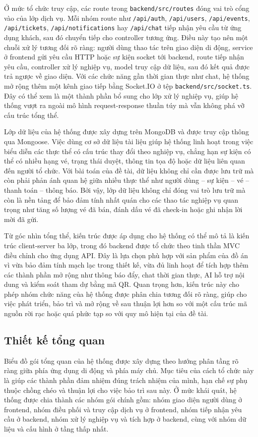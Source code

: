 \documentclass[../DoAn.tex]{subfiles}
\begin{document}
Ở mức tổ chức truy cập, các route trong \texttt{backend/src/routes} đóng vai trò cổng vào của lớp dịch vụ. Mỗi nhóm route như \texttt{/api/auth}, \texttt{/api/users}, \texttt{/api/events}, \texttt{/api/tickets}, \texttt{/api/notifications} hay \texttt{/api/chat} tiếp nhận yêu cầu từ ứng dụng khách, sau đó chuyển tiếp cho controller tương ứng. Điều này tạo nên một chuỗi xử lý tương đối rõ ràng: người dùng thao tác trên giao diện di động, service ở frontend gửi yêu cầu \gls{HTTP} hoặc sự kiện socket tới backend, route tiếp nhận yêu cầu, controller xử lý nghiệp vụ, model truy cập dữ liệu, sau đó kết quả được trả ngược về giao diện. Với các chức năng gần thời gian thực như chat, hệ thống mở rộng thêm một kênh giao tiếp bằng Socket.IO ở tệp \texttt{backend/src/socket.ts}. Đây có thể xem là một thành phần bổ sung cho lớp xử lý nghiệp vụ, giúp hệ thống vượt ra ngoài mô hình request-response thuần túy mà vẫn không phá vỡ cấu trúc tổng thể.

Lớp dữ liệu của hệ thống được xây dựng trên MongoDB và được truy cập thông qua Mongoose. Việc dùng cơ sở dữ liệu tài liệu giúp hệ thống linh hoạt trong việc biểu diễn các thực thể có cấu trúc thay đổi theo nghiệp vụ, chẳng hạn sự kiện có thể có nhiều hạng vé, trạng thái duyệt, thông tin tọa độ hoặc dữ liệu liên quan đến người tổ chức. Với bài toán của đề tài, dữ liệu không chỉ cần được lưu trữ mà còn phải phản ánh quan hệ giữa nhiều thực thể như người dùng -- sự kiện -- vé -- thanh toán -- thông báo. Bởi vậy, lớp dữ liệu không chỉ đóng vai trò lưu trữ mà còn là nền tảng để bảo đảm tính nhất quán cho các thao tác nghiệp vụ quan trọng như tăng số lượng vé đã bán, đánh dấu vé đã check-in hoặc ghi nhận lời mời đã gửi.

Từ góc nhìn tổng thể, kiến trúc được áp dụng cho hệ thống có thể mô tả là kiến trúc client-server ba lớp, trong đó backend được tổ chức theo tinh thần MVC điều chỉnh cho ứng dụng \gls{API}. Đây là lựa chọn phù hợp với sản phẩm của đồ án vì vừa bảo đảm tính mạch lạc trong thiết kế, vừa đủ linh hoạt để tích hợp thêm các thành phần mở rộng như thông báo đẩy, chat thời gian thực, AI hỗ trợ nội dung và kiểm soát tham dự bằng mã \gls{QR}. Quan trọng hơn, kiến trúc này cho phép nhóm chức năng của hệ thống được phân chia tương đối rõ ràng, giúp cho việc phát triển, bảo trì và mở rộng về sau thuận lợi hơn so với một cấu trúc mã nguồn rời rạc hoặc quá phức tạp so với quy mô hiện tại của đề tài.

\subsection{Thiết kế tổng quan}
Biểu đồ gói tổng quan của hệ thống được xây dựng theo hướng phân tầng rõ ràng giữa phía ứng dụng di động và phía máy chủ. Mục tiêu của cách tổ chức này là giúp các thành phần đảm nhiệm đúng trách nhiệm của mình, hạn chế sự phụ thuộc chồng chéo và thuận lợi cho việc bảo trì sau này. Ở mức khái quát, hệ thống được chia thành các nhóm gói chính gồm: nhóm giao diện người dùng ở frontend, nhóm điều phối và truy cập dịch vụ ở frontend, nhóm tiếp nhận yêu cầu ở backend, nhóm xử lý nghiệp vụ và tích hợp ở backend, cùng với nhóm dữ liệu và cấu hình ở tầng thấp nhất.
\end{document}
